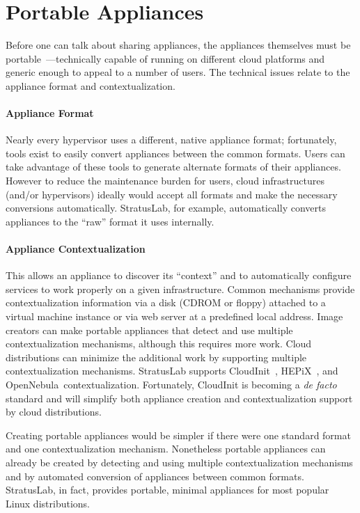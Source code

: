 \section{Portable Appliances}
\label{sec:portable-appliances}

Before one can talk about sharing appliances, the appliances
themselves must be portable~\cite{Petcu}---technically capable of
running on different cloud platforms and generic enough to appeal to a
number of users.  The technical issues relate to the appliance format
and contextualization.

\paragraph*{Appliance Format}
Nearly every hypervisor uses a different, native appliance format;
fortunately, tools exist to easily convert appliances between the
common formats.  Users can take advantage of these tools to generate
alternate formats of their appliances.  However to reduce the
maintenance burden for users, cloud infrastructures (and/or
hypervisors) ideally would accept all formats and make the necessary
conversions automatically.  StratusLab, for example, automatically
converts appliances to the ``raw'' format it uses internally.

\paragraph*{Appliance Contextualization}
This allows an appliance to discover its ``context'' and to
automatically configure services to work properly on a given
infrastructure.  Common mechanisms provide contextualization
information via a disk (CDROM or floppy) attached to a virtual machine
instance or via web server at a predefined local address.  Image
creators can make portable appliances that detect and use multiple
contextualization mechanisms, although this requires more work.  Cloud
distributions can minimize the additional work by supporting multiple
contextualization mechanisms.  StratusLab supports
CloudInit~\cite{cloudinit}, HEPiX~\cite{hepixbookcontext}, and
OpenNebula~\cite{opennebula}\@ contextualization.  Fortunately,
CloudInit is becoming a {\em de facto} standard and will simplify both
appliance creation and contextualization support by cloud
distributions.

Creating portable appliances would be simpler if there were one
standard format and one contextualization mechanism.  Nonetheless
portable appliances can already be created by detecting and using
multiple contextualization mechanisms and by automated conversion of
appliances between common formats.  StratusLab, in fact, provides
portable, minimal appliances for most popular Linux distributions.
